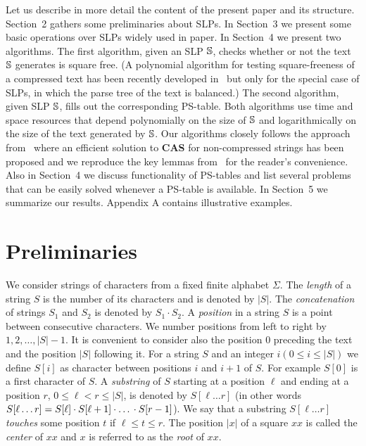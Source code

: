 ﻿\documentclass[11pt]{article}
\begin{document}
Let us describe in more detail the content of the present paper and its structure. Section~2 gathers some
preliminaries about SLPs. In Section~3 we present some basic operations over SLPs widely used in paper. In
Section~4 we present two algorithms. The first algorithm, given an SLP $\mathbb{S}$, checks whether or not the text
$\mathbb{S}$ generates is square free. (A polynomial algorithm for testing square-freeness of a compressed text has been
recently developed in~\cite{new} but only for the special case of SLPs, in which the parse tree of the text is
balanced.) The second algorithm, given SLP $\mathbb{S}$, fills out the corresponding PS-table. Both algorithms use time
and space resources that depend polynomially on the size of $\mathbb{S}$ and logarithmically on the size of the text
generated by $\mathbb{S}$. Our algorithms closely follows the approach from~\cite{2} where an efficient solution
to \textbf{CAS} for non-compressed strings has been proposed and we reproduce the key lemmas from~\cite{2} for the reader's
convenience. Also in Section~4 we discuss functionality of PS-tables and list several problems that can be easily solved
whenever a PS-table is available. In Section~5 we summarize our results. Appendix A contains illustrative examples.

\section{Preliminaries}

We consider strings of characters from a fixed finite alphabet $\Sigma$. The \emph{length} of a string $S$ is the number
of its characters and is denoted by $|S|$. The \emph{concatenation} of strings $S_1$ and $S_2$ is denoted by $S_1 \cdot
S_2$.  A \emph{position} in a string $S$ is a point between consecutive characters. We number positions from left to 
right by $1,2,\dots,|S|-1$. It is convenient to consider also the position 0 preceding the text and the position $|S|$ 
following it. For a string $S$ and an integer $i (0 \leq i \leq |S|)$ we define $S[i]$ as character between positions
$i$ and $i+1$ of $S$. For example $S[0]$ is a first character of $S$. A \emph{substring} of $S$ starting at a position
$\ell$  and ending at a position $r$, $0\leq \ell < r \leq |S|$, is denoted by $S[\ell \dots r]$ (in other words 
$S[\ell \dots r] = S[\ell] \cdot S[\ell + 1] \cdot \mbox{\dots} \cdot S[r-1]$). We say that a substring $S[\ell \dots
r]$ \emph{touches} some position $t$ if $\ell \leq t \leq r$. The position $|x|$ of a square $xx$ is called the
\emph{center} of $xx$ and $x$ is referred to as the \emph{root} of $xx$.
\end{document}
